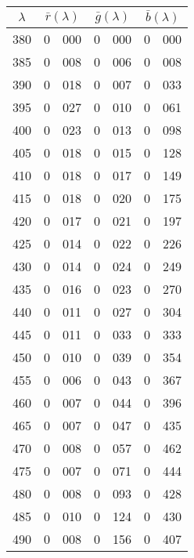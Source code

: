 {
\small
{

\noindent\resizebox{\linewidth}{!}{}\\
\setlength{\tabcolsep}{.35em}
\begin{minipage}{.3\textwidth}
\centering
\begin{tabular}{c|r@{.}l | r@{.}l | r@{.}l}
$\lambda$ & \multicolumn{2}{c|}{$\bar r(\lambda)$} &  \multicolumn{2}{c|}{$\bar g(\lambda)$} &  \multicolumn{2}{c}{$\bar b(\lambda)$} \\
\hline
 380 &   0&000 &   0&000 &   0&000 \\
 385 &   0&008 &   0&006 &   0&008 \\
 390 &   0&018 &   0&007 &   0&033 \\
 395 &   0&027 &   0&010 &   0&061 \\
 400 &   0&023 &   0&013 &   0&098 \\
 405 &   0&018 &   0&015 &   0&128 \\
 410 &   0&018 &   0&017 &   0&149 \\
 415 &   0&018 &   0&020 &   0&175 \\
 420 &   0&017 &   0&021 &   0&197 \\
 425 &   0&014 &   0&022 &   0&226 \\
 430 &   0&014 &   0&024 &   0&249 \\
 435 &   0&016 &   0&023 &   0&270 \\
 440 &   0&011 &   0&027 &   0&304 \\
 445 &   0&011 &   0&033 &   0&333 \\
 450 &   0&010 &   0&039 &   0&354 \\
 455 &   0&006 &   0&043 &   0&367 \\
 460 &   0&007 &   0&044 &   0&396 \\
 465 &   0&007 &   0&047 &   0&435 \\
 470 &   0&008 &   0&057 &   0&462 \\
 475 &   0&007 &   0&071 &   0&444 \\
 480 &   0&008 &   0&093 &   0&428 \\
 485 &   0&010 &   0&124 &   0&430 \\
 490 &   0&008 &   0&156 &   0&407 \\
\end{tabular}
\end{minipage}\hfill
\begin{minipage}{.3\textwidth}
\centering
\begin{tabular}{c|r@{.}l | r@{.}l | r@{.}l}

\end{tabular}
\end{minipage}}}
